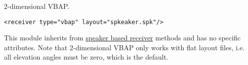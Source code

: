 2-dimensional VBAP.

\begin{lstlisting}[numbers=none]
<receiver type="vbap" layout="spkeaker.spk"/>
\end{lstlisting}

%

This module inherits from \hyperref[attrtab:speakerbased]{speaker based receiver} methods and has no specific attributes. Note that 2-dimensional VBAP only works with flat layout files, i.e. all elevation angles must be zero, which is the default.
